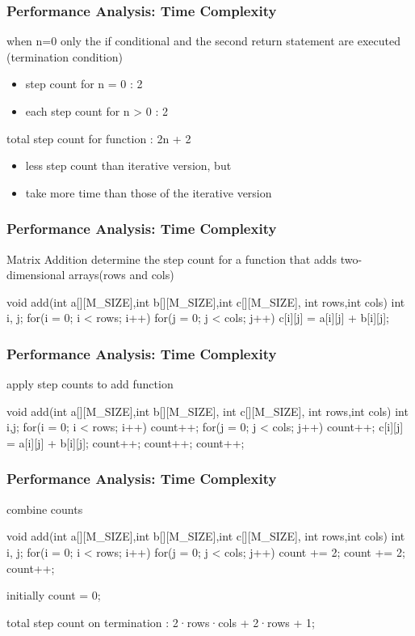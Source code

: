 \documentclass[newPxFont,sthlmFooter,nooffset]{beamer}
\begin{document}
\begin{frame}[t]
  \frametitle{Performance Analysis: Time Complexity}
when n=0 only the if conditional and the second return statement are executed (termination condition)

\begin{itemize}
\item step count for n = 0 : 2
\item each step count for n > 0 : 2
\end{itemize}

total step count for function : 2n + 2
\begin{itemize}
\item  less step count than iterative version, but
\item take more time than those of the iterative version
\end{itemize}

\end{frame}


\begin{frame}[t, fragile]
  \frametitle{Performance Analysis: Time Complexity}
Matrix Addition determine the step count for a function that adds
two-dimensional arrays(rows and cols)
\begin{codedef}
void add(int a[][M_SIZE],int b[][M_SIZE],int c[][M_SIZE],
         int rows,int cols) {
   int i, j;
   for(i = 0; i < rows; i++)
      for(j = 0; j < cols; j++) 
         c[i][j] = a[i][j] + b[i][j];
}
\end{codedef}
\end{frame}


\begin{frame}[t, fragile]
  \frametitle{Performance Analysis: Time Complexity}
apply step counts to add function
\begin{codedef}
void add(int a[][M_SIZE],int b[][M_SIZE], int c[][M_SIZE],
         int rows,int cols) {
   int i,j;
   for(i = 0; i < rows; i++) {
      count++;
      for(j = 0; j < cols; j++) {
         count++;
         c[i][j] = a[i][j] + b[i][j];
         count++;
      }
      count++; 
   }
   count++; 
}
\end{codedef}
\end{frame}


\begin{frame}[t, fragile]
  \frametitle{Performance Analysis: Time Complexity}
combine counts
\begin{codedef}
void add(int a[][M_SIZE],int b[][M_SIZE],int c[][M_SIZE],
         int rows,int cols) {
   int i, j;
   for(i = 0; i < rows; i++) {
      for(j = 0; j < cols; j++)
         count += 2;
      count += 2; 
      }
   count++; 
}
\end{codedef}
initially count = 0;

total step count on termination : 2·rows·cols + 2·rows + 1;
\end{frame}
\end{document}
